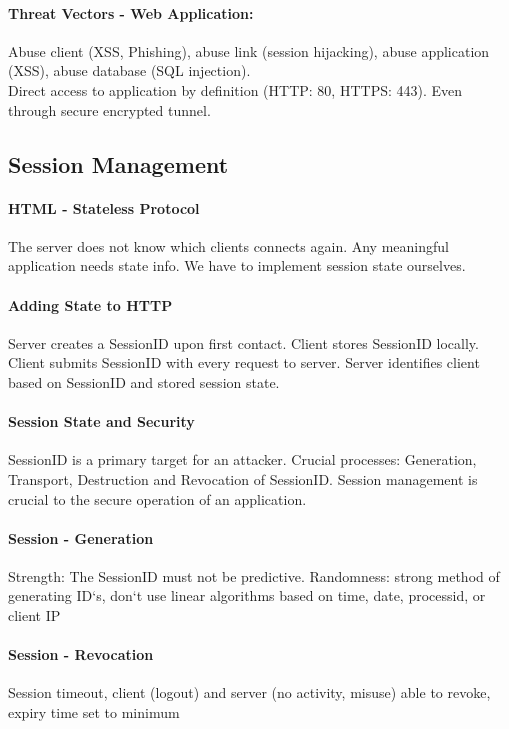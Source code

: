 \paragraph{Threat Vectors - Web Application:} Abuse client (XSS, Phishing), abuse link (session hijacking), abuse application (XSS), abuse database (SQL injection). \\
Direct access to application by definition (HTTP: 80, HTTPS: 443). Even through secure encrypted tunnel.

\subsection{Session Management}

\paragraph{HTML - Stateless Protocol} The server does not know which clients connects again. Any meaningful application needs state info. We have to implement session state ourselves.

\paragraph{Adding State to HTTP} Server creates a SessionID upon first contact. Client stores SessionID locally. Client submits SessionID with every request to server. Server identifies client based on SessionID and stored session state.

\paragraph{Session State and Security}
SessionID is a primary target for an attacker. Crucial processes: Generation, Transport, Destruction and Revocation of SessionID. Session management is crucial to the secure operation of an application.


\paragraph{Session - Generation}
Strength: The SessionID must not be predictive. Randomness: strong method of generating ID‘s, don‘t use linear algorithms based on time, date, processid, or client IP

\paragraph{Session - Revocation}
Session timeout, client (logout) and server (no activity, misuse) able to revoke, expiry time set to minimum

